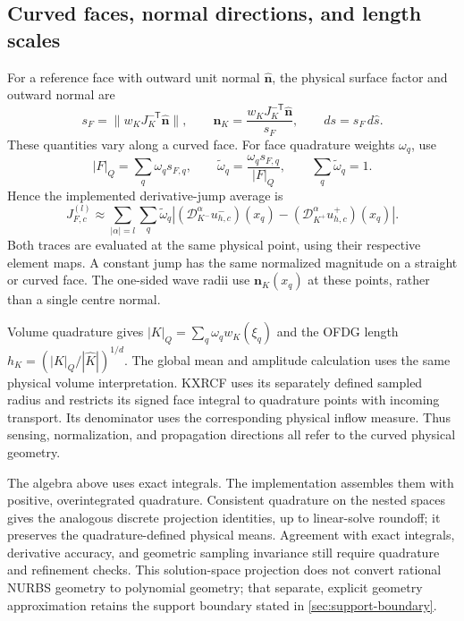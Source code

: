 \subsection{Curved faces, normal directions, and length scales}
For a reference face with outward unit normal $\widehat{\boldsymbol n}$, the
physical surface factor and outward normal are
\begin{equation}
 s_F=\|w_KJ_K^{-\mathsf T}\widehat{\boldsymbol n}\|,
 \qquad \boldsymbol n_K=
 \frac{w_KJ_K^{-\mathsf T}\widehat{\boldsymbol n}}{s_F},
 \qquad ds=s_F\,d\widehat s.
 \label{eq:curved-face-metric}
\end{equation}
These quantities vary along a curved face. For face quadrature weights
$\omega_q$, use
\begin{equation}
 |F|_Q=\sum_q\omega_qs_{F,q},\qquad
 \widetilde\omega_q=\frac{\omega_qs_{F,q}}{|F|_Q},\qquad
 \sum_q\widetilde\omega_q=1.
 \label{eq:curved-face-normalization}
\end{equation}
Hence the implemented derivative-jump average is
\begin{equation}
 J_{F,c}^{(l)}\approx\sum_{|\alpha|=l}\sum_q\widetilde\omega_q
 \left| (\mathscr D_{K^-}^{\alpha}u_{h,c}^-)(x_q)
       -(\mathscr D_{K^+}^{\alpha}u_{h,c}^+)(x_q)\right|.
\end{equation}
Both traces are evaluated at the same physical point, using their respective
element maps. A constant jump has the same normalized magnitude on a straight
or curved face. The one-sided wave radii use $\boldsymbol n_K(x_q)$ at these
points, rather than a single centre normal.

Volume quadrature gives $|K|_Q=\sum_q\omega_qw_K(\xi_q)$ and the OFDG length
$h_K=(|K|_Q/|\widehat K|)^{1/d}$. The global mean and amplitude calculation
uses the same physical volume interpretation. KXRCF uses its separately defined
sampled radius and restricts its signed face integral to quadrature points
with incoming transport. Its denominator uses the corresponding physical
inflow measure. Thus sensing, normalization, and propagation directions all
refer to the curved physical geometry.

The algebra above uses exact integrals. The implementation assembles them
with positive, overintegrated quadrature. Consistent quadrature on the nested
spaces gives the analogous discrete projection identities, up to linear-solve
roundoff; it preserves the quadrature-defined physical means. Agreement with
exact integrals, derivative accuracy, and geometric sampling invariance still
require quadrature and refinement checks. This solution-space
projection does not convert rational NURBS geometry to polynomial geometry;
that separate, explicit geometry approximation retains the support boundary
stated in \cref{sec:support-boundary}.
